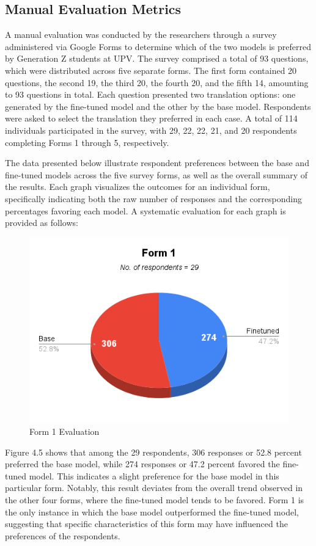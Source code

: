 \subsection{Manual Evaluation Metrics}
A manual evaluation was conducted by the researchers through a survey administered via Google Forms to determine which of the two models is preferred by Generation Z students at UPV. The survey comprised a total of 93 questions, which were distributed across five separate forms. The first form contained 20 questions, the second 19, the third 20, the fourth 20, and the fifth 14, amounting to 93 questions in total. Each question presented two translation options: one generated by the fine-tuned model and the other by the base model. Respondents were asked to select the translation they preferred in each case. A total of 114 individuals participated in the survey, with 29, 22, 22, 21, and 20 respondents completing Forms 1 through 5, respectively. 

The data presented below illustrate respondent preferences between the base and fine-tuned models across the five survey forms, as well as the overall summary of the results. Each graph visualizes the outcomes for an individual form, specifically indicating both the raw number of responses and the corresponding percentages favoring each model. A systematic evaluation for each graph is provided as follows:

\begin{figure}[H]
	\centering
	\includegraphics[scale=0.7]{figures/Form1.png}
	\caption{Form 1 Evaluation}
\end{figure}

Figure 4.5 shows that among the 29 respondents, 306 responses or 52.8 percent preferred the base model, while 274 responses or 47.2 percent favored the fine-tuned model. This indicates a slight preference for the base model in this particular form. Notably, this result deviates from the overall trend observed in the other four forms, where the fine-tuned model tends to be favored. Form 1 is the only instance in which the base model outperformed the fine-tuned model, suggesting that specific characteristics of this form may have influenced the preferences of the respondents. 


